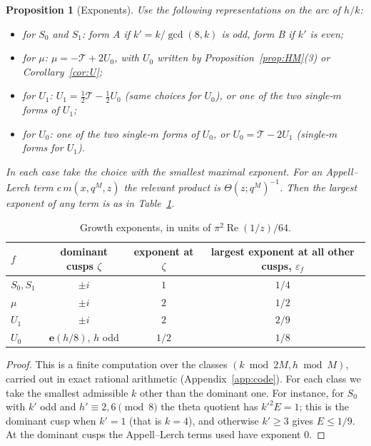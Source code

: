 \documentclass[11pt]{amsart}
\newtheorem{proposition}[theorem]{Proposition}
\theoremstyle{definition}
\theoremstyle{remark}
\numberwithin{equation}{section}
\newcommand{\e}{\mathbf{e}}
\newcommand{\re}{\operatorname{Re}}
\newcommand{\THq}{\mathcal{T}}
\begin{document}
\begin{proposition}[Exponents]\label{prop:exponents}
Use the following representations on the arc of $h/k$:
\begin{itemize}
\item for $S_0$ and $S_1$: form A if $k'=k/\gcd(8,k)$ is odd, form B if $k'$ is even;
\item for $\mu$: $\mu=-\THq+2U_0$, with $U_0$ written by Proposition~\ref{prop:HM}(3) or Corollary~\ref{cor:U};
\item for $U_1$: $U_1=\frac12\THq-\frac12U_0$ (same choices for $U_0$), or one of the two single-$m$ forms of $U_1$;
\item for $U_0$: one of the two single-$m$ forms of $U_0$, or $U_0=\THq-2U_1$ (single-$m$ forms for $U_1$).
\end{itemize}
In each case take the choice with the smallest maximal exponent.
For an Appell--Lerch term $c\,m(x,q^M,z)$ the relevant product is $\Theta(z;q^M)^{-1}$.
Then the largest exponent of any term is as in Table~\ref{tab:exp}.
\end{proposition}

\begin{table}[ht]
\centering
\renewcommand{\arraystretch}{1.2}
\begin{tabular}{@{}lccc@{}}
\toprule
$f$ & dominant cusps $\zeta$ & exponent at $\zeta$ & largest exponent at all other cusps, $\varepsilon_f$\\
\midrule
$S_0,S_1$ & $\pm i$ & $1$ & $1/4$\\
$\mu$ & $\pm i$ & $2$ & $1/2$\\
$U_1$ & $\pm i$ & $2$ & $2/9$\\
$U_0$ & $\e(h/8)$, $h$ odd & $1/2$ & $1/8$\\
\bottomrule
\end{tabular}
\caption{Growth exponents, in units of $\pi^2\re(1/z)/64$.}\label{tab:exp}
\end{table}

\begin{proof}
This is a finite computation over the classes $(k\bmod 2M,h\bmod M)$, carried out in exact rational arithmetic (Appendix~\ref{app:code}).
For each class we take the smallest admissible $k$ other than the dominant one.
For instance, for $S_0$ with $k'$ odd and $h'\equiv2,6\pmod 8$ the theta quotient has $k'^2E=1$; this is the dominant cusp when $k'=1$ (that is $k=4$), and otherwise $k'\ge3$ gives $E\le1/9$.
At the dominant cusps the Appell--Lerch terms used have exponent $0$.
\end{proof}
\end{document}
